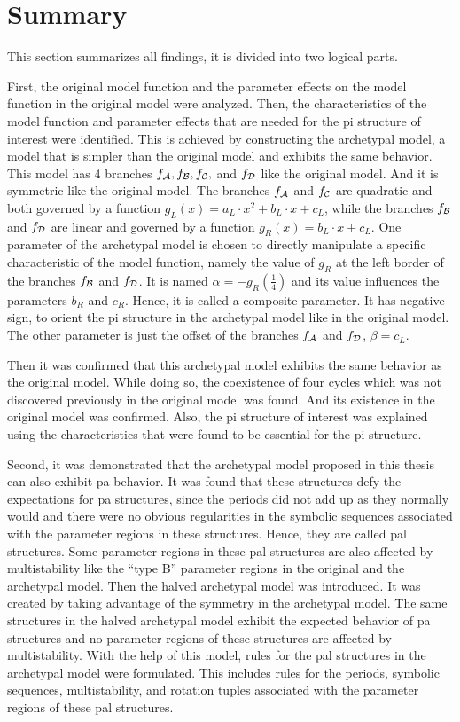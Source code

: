 \section{Summary}
\label{sec:concl.sum}

This section summarizes all findings, it is divided into two logical parts.

First, the original model function and the parameter effects on the model function in the original model were analyzed.
Then, the characteristics of the model function and parameter effects that are needed for the \gls{pi} structure of interest were identified.
This is achieved by constructing the archetypal model, a model that is simpler than the original model and exhibits the same behavior.
This model has 4 branches $f_{\mathcal{A}}, f_{\mathcal{B}}, f_{\mathcal{C}},$ and $f_{\mathcal{D}}$ like the original model.
And it is symmetric like the original model.
The branches $f_{\mathcal{A}}$ and $f_{\mathcal{C}}$ are quadratic and both governed by a function $g_L(x) = a_L \cdot x^2 + b_L \cdot x + c_L$, while the branches $f_{\mathcal{B}}$ and $f_{\mathcal{D}}$ are linear and governed by a function $g_R(x) = b_L \cdot x + c_L$.
One parameter of the archetypal model is chosen to directly manipulate a specific characteristic of the model function, namely the value of $g_R$ at the left border of the branches $f_{\mathcal{B}}$ and $f_{\mathcal{D}}$.
It is named $\alpha = -g_R\left(\frac{1}{4}\right)$ and its value influences the parameters $b_R$ and $c_R$.
Hence, it is called a composite parameter.
It has negative sign, to orient the \gls{pi} structure in the archetypal model like in the original model.
The other parameter is just the offset of the branches $f_{\mathcal{A}}$ and $f_{\mathcal{D}}$, $\beta = c_L$.

Then it was confirmed that this archetypal model exhibits the same behavior as the original model.
While doing so, the coexistence of four cycles which was not discovered previously in the original model was found.
And its existence in the original model was confirmed.
Also, the \gls{pi} structure of interest was explained using the characteristics that were found to be essential for the \gls{pi} structure.

Second, it was demonstrated that the archetypal model proposed in this thesis can also exhibit \gls{pa} behavior.
It was found that these structures defy the expectations for \gls{pa} structures, since the periods did not add up as they normally would and there were no obvious regularities in the symbolic sequences associated with the parameter regions in these structures.
Hence, they are called \gls{pal} structures.
Some parameter regions in these \gls{pal} structures are also affected by multistability like the ``type B'' parameter regions in the original and the archetypal model.
Then the halved archetypal model was introduced.
It was created by taking advantage of the symmetry in the archetypal model.
The same structures in the halved archetypal model exhibit the expected behavior of \gls{pa} structures and no parameter regions of these structures are affected by multistability.
With the help of this model, rules for the \gls{pal} structures in the archetypal model were formulated.
This includes rules for the periods, symbolic sequences, multistability, and rotation tuples associated with the parameter regions of these \gls{pal} structures.
